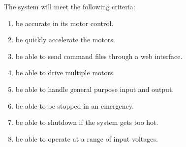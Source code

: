 The system will meet the following criteria:
\begin{enumerate} \parskip2pt
	
	\item be accurate in its motor control.
	\item be quickly accelerate the motors.
	\item be able to send command files through a web interface.
	\item be able to drive multiple motors.
	\item be able to handle general purpose input and output.
	\item be able to be stopped in an emergency.
	\item be able to shutdown if the system gets too hot. 
	\item be able to operate at a range of input voltages.
\end{enumerate}